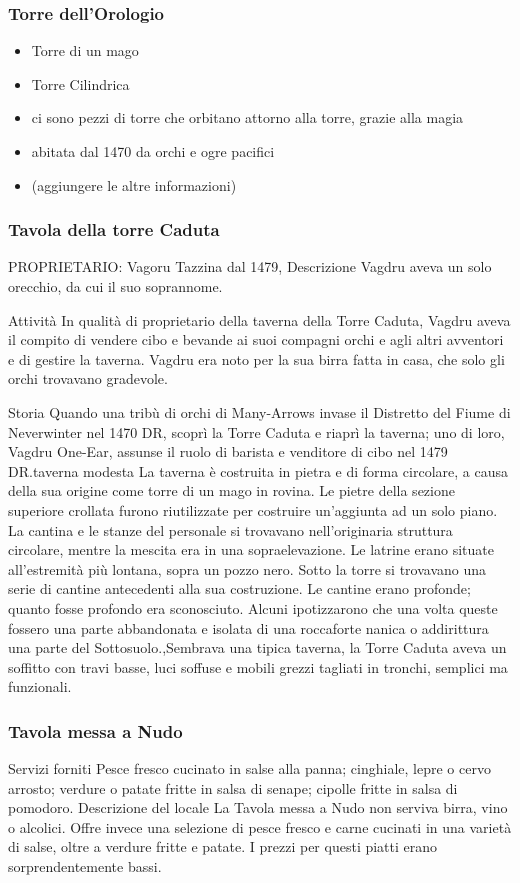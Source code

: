 \documentclass{article}
\begin{document}
              \subsubsection{Torre dell'Orologio}
\begin{itemize}
    \item Torre di un mago
    \item Torre Cilindrica
    \item ci sono pezzi di torre che orbitano attorno alla torre, grazie alla magia
    \item abitata dal 1470 da orchi e ogre pacifici
    \item (aggiungere le altre informazioni)
\end{itemize}
              \subsubsection{Tavola della torre Caduta}
PROPRIETARIO: Vagoru Tazzina dal 1479, Descrizione
Vagdru aveva un solo orecchio, da cui il suo soprannome.


Attività
In qualità di proprietario della taverna della Torre Caduta, Vagdru aveva il compito di vendere cibo e bevande ai suoi compagni orchi e agli altri avventori e di gestire la taverna. Vagdru era noto per la sua birra fatta in casa, che solo gli orchi trovavano gradevole.

Storia
Quando una tribù di orchi di Many-Arrows invase il Distretto del Fiume di Neverwinter nel 1470 DR, scoprì la Torre Caduta e riaprì la taverna; uno di loro, Vagdru One-Ear, assunse il ruolo di barista e venditore di cibo nel 1479 DR.taverna modesta
La taverna è costruita in pietra e di forma circolare, a causa della sua origine come torre di un mago in rovina. Le pietre della sezione superiore crollata furono riutilizzate per costruire un'aggiunta ad un solo piano. La cantina e le stanze del personale si trovavano nell'originaria struttura circolare, mentre la mescita era in una sopraelevazione. Le latrine erano situate all'estremità più lontana, sopra un pozzo nero. Sotto la torre si trovavano una serie di cantine antecedenti alla sua costruzione. Le cantine erano profonde; quanto fosse profondo era sconosciuto. Alcuni ipotizzarono che una volta queste fossero una parte abbandonata e isolata di una roccaforte nanica o addirittura una parte del Sottosuolo.,Sembrava una tipica taverna, la Torre Caduta aveva un soffitto con travi basse, luci soffuse e mobili grezzi tagliati in tronchi, semplici ma funzionali.
              \subsubsection{Tavola messa a Nudo}
Servizi forniti\newline
Pesce fresco cucinato in salse alla panna; cinghiale, lepre o cervo arrosto; verdure o patate fritte in salsa di senape; cipolle fritte in salsa di pomodoro.\newline
Descrizione del locale\newline
La Tavola messa a Nudo non serviva birra, vino o alcolici. Offre invece una selezione di pesce fresco e carne cucinati in una varietà di salse, oltre a verdure fritte e patate. I prezzi per questi piatti erano sorprendentemente bassi.
\end{document}
